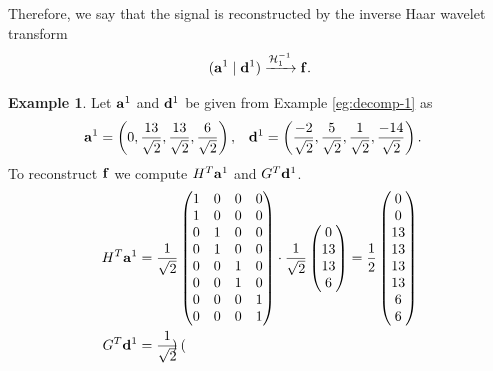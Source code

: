 \documentclass{article}
\theoremstyle{definition}
\newtheorem{example}[definition]{Example}
\begin{document}
  Therefore, we say that the signal is reconstructed by the inverse Haar wavelet transform
  \begin{equation}
    (\vb{a}^1 \mid \vb{d}^1)  \xrightarrow{\mathcal{H}^{-1}_1} \vb{f}.
  \end{equation}

  \begin{example}
    Let \(\vb{a}^1\) and \(\vb{d}^1\) be given from Example \ref{eg:decomp-1} as
    \begin{align*}
      \vb{a}^1 &= \left(
        0,
        \frac{13}{\sqrt{2}},
        \frac{13}{\sqrt{2}},
        \frac{6}{\sqrt{2}}
      \right), &
      \vb{d}^1 &= \left(
        \frac{-2}{\sqrt{2}},
        \frac{5}{\sqrt{2}},
        \frac{1}{\sqrt{2}},
        \frac{-14}{\sqrt{2}}
      \right).
    \end{align*}
    To reconstruct \(\vb{f}\) we compute \(H^T\vb{a}^1\) and \(G^T\vb{d}^1\).
    \begin{align*}
      H^T\vb{a}^1 &= \frac{1}{\sqrt{2}}
      \begin{pmatrix}
        1 & 0 & 0 & 0\\
        1 & 0 & 0 & 0\\
        0 & 1 & 0 & 0\\
        0 & 1 & 0 & 0\\
        0 & 0 & 1 & 0\\
        0 & 0 & 1 & 0\\
        0 & 0 & 0 & 1\\
        0 & 0 & 0 & 1
      \end{pmatrix} \cdot \frac{1}{\sqrt{2}}
      \begin{pmatrix}
        0 \\
        13 \\
        13 \\
        6
      \end{pmatrix} = \frac{1}{2}
      \begin{pmatrix}
        0 \\
        0 \\
        13 \\
        13 \\
        13 \\
        13 \\
        6 \\
        6 \\
      \end{pmatrix}\\
      G^T\vb{d}^1 &= \frac{1}{\sqrt{2}}
      \begin{pmatrix}

\end{pmatrix}
\end{align*}
\end{example}
\end{document}
